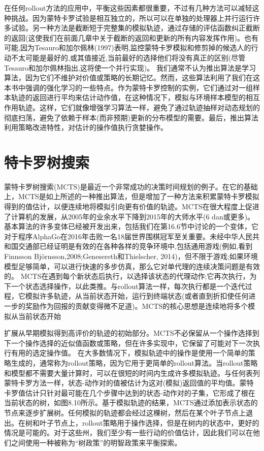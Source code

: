 在任何rollout方法的应用中，平衡这些因素都很重要，不过有几种方法可以减轻这种挑战。因为蒙特卡罗试验是相互独立的，所以可以在单独的处理器上并行运行许多试验。另一种方法是截断短于完整集的模拟轨迹，通过存储的评估函数纠正截断的返回(这使我们在前面几章中关于截断的返回和更新的所有内容发挥作用)。也有可能,因为Tesauro和加尔佩林(1997)表明,监控蒙特卡罗模拟和修剪掉的候选人的行动不太可能是最好的,或其值接近,当前最好的选择他们将没有真正的区别(尽管Tesauro和加尔佩林指出,这将使一个并行实现)。
我们通常不认为推出算法是学习算法，因为它们不维护对价值或策略的长期记忆。然而，这些算法利用了我们在这本书中强调的强化学习的一些特点。作为蒙特卡罗控制的实例，它们通过对一组样本轨迹的返回进行平均来估计动作值，在这种情况下，模拟与环境样本模型的相互作用轨迹。这样，它们就像增强学习算法一样，避免了通过轨迹抽样对动态规划的彻底扫荡，避免了依赖于样本(而非预期)更新的分布模型的需要。最后，推出算法利用策略改进特性，对估计的操作值执行贪婪操作。


\section{特卡罗树搜索}

蒙特卡罗树搜索(MCTS)是最近一个非常成功的决策时间规划的例子。在它的基础上，MCTS是如上所述的一种推出算法，但是增加了一种方法来积累蒙特卡罗模拟得到的值估计，以便连续地将模拟引向更有价值的轨迹。MCTS在很大程度上促进了计算机的发展，从2005年的业余水平下降到2015年的大师水平(6 dan或更多)。基本算法的许多变体已经被开发出来，包括我们在第16.6节中讨论的一个变体，它对于程序AlphaGo在2016年击败一名18届世界围棋冠军至关重要。未经中华人民共和国交通部已经证明是有效的在各种各样的竞争环境中,包括通用游戏(例如,看到Finnsson Björnsson,2008;Genesereth和Thielscher, 2014)，但不限于游戏;如果环境模型足够简单，可以进行快速的多步仿真，那么它对单代理的连续决策问题是有效的。
MCTS在遇到每个新状态后执行，以选择该状态的代理动作;它再次执行，为下一个状态选择操作，以此类推。与rollout算法一样，每次执行都是一个迭代过程，它模拟许多轨迹，从当前状态开始，运行到终端状态(或者直到折扣使任何进一步的奖励作为回报的贡献变得微不足道)。MCTS的核心思想是连续地将多个模拟从当前状态开始

扩展从早期模拟得到高评价的轨迹的初始部分。MCTS不必保留从一个操作选择到下一个操作选择的近似值函数或策略，但在许多实现中，它保留了可能对下一次执行有用的选定操作值。
在大多数情况下，模拟轨迹中的操作是使用一个简单的策略生成的，通常称为rollout策略，因为它用于更简单的rollout算法。当rollout策略和模型都不需要大量计算时，可以在很短的时间内生成许多模拟轨迹。与任何表列蒙特卡罗方法一样，状态-动作对的值被估计为这对(模拟)返回值的平均值。蒙特卡罗值估计只针对最可能在几个步骤中达到的状态-动作对的子集，它形成了根在当前状态的树，如图8.10所示。基于模拟轨迹的结果，MCTS通过添加表示状态的节点来逐步扩展树。任何模拟的轨迹都会经过这棵树，然后在某个叶子节点上退出。在树和叶子节点上，rollout策略用于操作选择，但是在树内的状态中，更好的情况是可能的。对于这些州，我们至少有一些行动的价值估计，因此我们可以在他们之间使用一种被称为“树政策”的明智政策来平衡探索。

